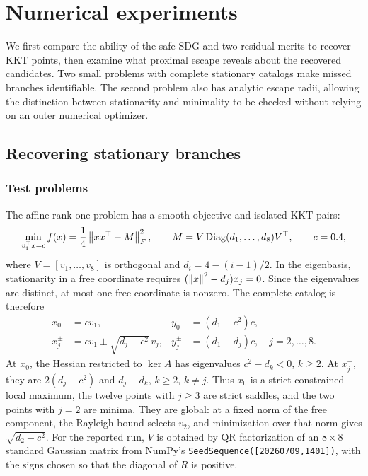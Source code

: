 \section{Numerical experiments}
\label{sec:experiments}

We first compare the ability of the safe SDG and two residual merits to
recover KKT points, then examine what proximal escape reveals about the
recovered candidates.  Two small problems with complete stationary catalogs
make missed branches identifiable.  The second problem also has analytic
escape radii, allowing the distinction between stationarity and minimality
to be checked without relying on an outer numerical optimizer.

\subsection{Recovering stationary branches}
\label{subsec:experiments-root-recovery}

\subsubsection{Test problems}

The affine rank-one problem has a smooth objective and isolated KKT pairs:
\begin{equation}
  \min_{v_1^\top x=c} f(x)=\frac14\left\lVert xx^\top-M\right\rVert_F^2,
  \qquad
  M=V\operatorname{Diag}(d_1,\ldots,d_8)V^\top,
  \qquad c=0.4,
  \label{eq:experiment-affine-rank-one}
\end{equation}
where \(V=[v_1,\ldots,v_8]\) is orthogonal and
\(d_i=4-(i-1)/2\).  In the eigenbasis, stationarity in a free coordinate
requires \((\left\lVert x\right\rVert^2-d_j)x_j=0\).  Since the eigenvalues are distinct,
at most one free coordinate is nonzero.  The complete catalog is therefore
\begin{equation}
  \begin{aligned}
    x_0&=cv_1,
    &y_0&=(d_1-c^2)c,\\
    x_j^\pm&=cv_1\pm\sqrt{d_j-c^2}\,v_j,
    &y_j^\pm&=(d_1-d_j)c,\quad j=2,\ldots,8.
  \end{aligned}
  \label{eq:experiment-affine-oracle}
\end{equation}
At \(x_0\), the Hessian restricted to \(\ker A\) has eigenvalues
\(c^2-d_k<0\), \(k\ge2\).  At \(x_j^\pm\), they are
\(2(d_j-c^2)\) and \(d_j-d_k\), \(k\ge2\), \(k\ne j\).
Thus \(x_0\) is a strict constrained local maximum, the twelve points
with \(j\ge3\) are strict saddles, and the two points with \(j=2\)
are minima.  They are global: at a fixed norm of the free component,
the Rayleigh bound selects \(v_2\), and minimization over that norm
gives \(\sqrt{d_2-c^2}\).
For the reported run, \(V\) is obtained by QR factorization of an
\(8\times8\) standard Gaussian matrix from NumPy's
\texttt{SeedSequence([20260709,1401])}, with the signs chosen so that
the diagonal of \(R\) is positive.


